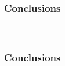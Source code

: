 
\begin{frame}[t]
	\frametitle{Conclusions}
	\framesubtitle{~~}  %

\end{frame}
\begin{frame}[t]
	\frametitle{Conclusions}
	\framesubtitle{~~}  %

\end{frame}


